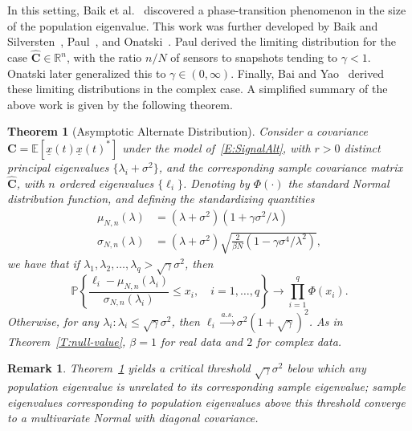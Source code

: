 \documentclass[final]{IEEEtran}
\newtheorem{theorem}{Theorem}
\newtheorem{rem}{Remark}
\newcommand{\vectorsymbol}{\underline}
\newcommand{\matrixsymbol}{\boldsymbol}
\newcommand{\mC}{\matrixsymbol{C}}
\newcommand{\mhC}{\widehat{\matrixsymbol{C}}}
\newcommand{\vx}{\vectorsymbol{x}}
\newcommand{\E}{\mathbb{E}}
\newcommand{\Prob}{\mathbb{P}}
\begin{document}
In this setting, Baik et al.~\cite{baik2005pto} discovered a phase-transition phenomenon in the size of the population eigenvalue.  This work was further developed by Baik and Silversten~\cite{baik2006els}, Paul~\cite{paul2007ase}, and Onatski~\cite{onatski2007adp}.  Paul derived the limiting distribution for the case $\mhC \in \mathbb{R}^n$, with the ratio $n/N$ of sensors to snapshots tending to $\gamma < 1$.  Onatski later generalized this to $\gamma \in (0,\infty)$.  Finally, Bai and Yao~\cite{bai2008clt} derived these limiting distributions in the complex case.  A simplified summary of the above work is given by the following theorem.
\begin{theorem}[Asymptotic Alternate Distribution]\label{T:spiked-value}
    Consider a covariance $\mC = \E\left[ \vx(t) \vx(t)^* \right]$ under the model of~\eqref{E:SignalAlt}, with $r>0$ distinct principal eigenvalues $\{\lambda_i + \sigma^2\}$, and the corresponding
    sample covariance matrix $\mhC$, with $n$ ordered eigenvalues $\{\ell_i\}$.
    Denoting by $\Phi( \cdot )$ the standard Normal distribution function, and defining the standardizing quantities
    \begin{align*}
        \mu_{N,n}(\lambda)
            &= \left( \lambda + \sigma^2 \right)
                \left(1 + \gamma \sigma^2/\lambda \right) \\
        \sigma_{N,n}(\lambda)
            &= \left( \lambda + \sigma^2 \right) \textstyle
               \sqrt{
                   \frac{2}{\beta N}
                   \left( 1 - \gamma \sigma^4/\lambda^2 \right)
               },
    \end{align*}
    we have that if $\lambda_{1}, \lambda_{2}, \ldots, \lambda_{q} > \sqrt{\gamma} \sigma^2$, then
    \begin{equation*}
        \Prob \left\{ \frac{\ell_i - \mu_{N,n}(\lambda_i)}
                           {\sigma_{N,n}(\lambda_i)}       \leq x_i,
                            \quad
                            i = 1, \ldots, q \right\}
        \to
        \prod_{i=1}^q \Phi ( x_i ).
    \end{equation*}
    Otherwise, for any $\lambda_i\!:\! \lambda_i \leq \sqrt{\gamma} \sigma^2$, then $\ell_i \overset{a.s.}{\longrightarrow} \sigma^2 \left( 1 + \sqrt{\gamma} \right)^2$.
    As in Theorem~\ref{T:null-value}, $\beta = 1$ for real data and
    $2$ for complex data.
\end{theorem}
\begin{rem}
Theorem~\ref{T:spiked-value} yields a critical threshold $\sqrt{\gamma} \sigma^2$
below which any population eigenvalue is unrelated to its corresponding sample eigenvalue; sample eigenvalues corresponding to population eigenvalues above this threshold converge to a multivariate Normal with diagonal covariance.
\end{rem}
\end{document}

